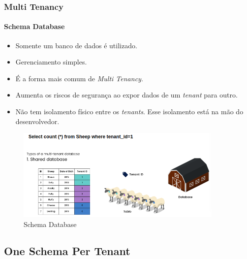 \documentclass[
	9pt, %
	t, %
]{beamer}
\begin{document}
\begin{frame}
	\frametitle{Multi Tenancy}
	\framesubtitle{Schema Database}

	\begin{itemize}
		\item Somente um banco de dados é utilizado.
		\item Gerenciamento simples.
		\item É a forma mais comum de \textit{Multi Tenancy}.
		\item \alert{Aumenta os riscos de segurança ao expor dados de um \textit{tenant} para outro.}
		\item \alert{Não tem isolamento físico entre os \textit{tenants}.} Esse isolamento está na mão do desenvolvedor.
		
	\end{itemize}

	\begin{figure}
		\centering
		\includegraphics[width=0.9\textwidth]{schema_database.png}
		\caption{Schema Database}
	\end{figure}

\end{frame}

\subsection{One Schema Per Tenant}
\end{document}
